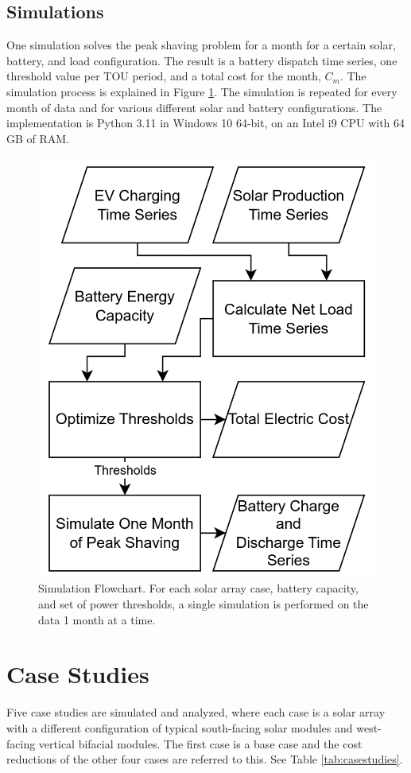 \documentclass[conference]{IEEEtran}
\begin{document}
\subsection{Simulations}

One simulation solves the peak shaving problem for a month for a certain solar, battery, and load configuration. The result is a battery dispatch time series, one threshold value per TOU period, and a total cost for the month, $C_m$. The simulation process is explained in Figure \ref{fig:simulation-flowchart}. The simulation is repeated for every month of data and for various different solar and battery configurations. The implementation is Python 3.11 in Windows 10 64-bit, on an Intel i9 CPU with 64 GB of RAM.

\begin{figure}
    \centering
    \includegraphics[width=0.6\linewidth]{images/simulation flowchart.png}
    \caption{Simulation Flowchart. For each solar array case, battery capacity, and set of power thresholds, a single simulation is performed on the data 1 month at a time.}
    \label{fig:simulation-flowchart}
\end{figure}

\section{Case Studies}

Five case studies are simulated and analyzed, where each case is a solar array with a different configuration of typical south-facing solar modules and west-facing vertical bifacial modules. The first case is a base case and the cost reductions of the other four cases are referred to this. See Table \ref{tab:casestudies}.
\end{document}
